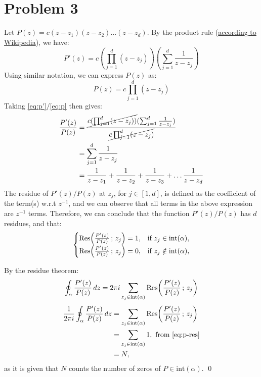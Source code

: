 \documentclass[letterpaper, titlepage, DIV=14]{scrartcl}
\begin{document}
    \section*{Problem 3}
    Let $P(z)=c(z-z_{1})(z-z_{2})\ldots(z-z_{d})$. By the product rule (\href{https://en.wikipedia.org/wiki/Product_rule}{according to Wikipedia}), we have:
    \begin{equation}
      P'(z) = c (\prod_{j=1}^{d}(z-z_{j}))(\sum_{j=1}^{d}\frac{1}{z-z_{j}}) \label{eq:p'}
    \end{equation}
    Using similar notation, we can express $P(z)$ as:
    \begin{equation}
      P(z) = c\prod_{j=1}^{d}(z-z_{j}) \label{eq:p}
    \end{equation}
    Taking \eqref{eq:p'}$/$\eqref{eq:p} then gives:
    \begin{align*}
      \frac{P'(z)}{P(z)} &= \frac{\cancel{c (\prod_{j=1}^{d}(z-z_{j}))}(\sum_{j=1}^{d}\frac{1}{z-z_{j}})}{\cancel{c\prod_{j=1}^{d}(z-z_{j})}} \\
        &= \sum_{j=1}^{d}\frac{1}{z-z_{j}} \\
        &= \frac{1}{z-z_{1}} + \frac{1}{z-z_{2}} + \frac{1}{z-z_{3}} + \ldots \frac{1}{z-z_{d}}
    \end{align*}
    The residue of $P'(z)/P(z)$ at $z_{j}$, for $j\in[1,d]$, is defined as the coefficient of the term(s) w.r.t $z^{-1}$, and we can observe that all terms in the above expression are $z^{-1}$ terms. Therefore, we can conclude that the function $P'(z)/P(z)$ has $d$ residues, and that:
    \begin{equation}
      \begin{cases}
        \Res(\frac{P'(z)}{P(z)} \, ; \, z_{j}) = 1, & \text{if } z_{j}\in\text{int}(\alpha), \\
        \Res(\frac{P'(z)}{P(z)} \, ; \, z_{j}) = 0, & \text{if } z_{j}\notin \text{int}(\alpha),
      \end{cases} \label{eq:p-res}
    \end{equation}
  
    By the residue theorem:
    \begin{equation*}
      \oint_{\alpha}\frac{P'(z)}{P(z)} \, dz = 2\pi i \sum_{z_{j}\in\text{int}(\alpha)} \Res(\frac{P'(z)}{P(z)} \, ; \, z_{j})
    \end{equation*}
    \begin{align*}
      \frac{1}{2\pi i}\oint_{\alpha}\frac{P'(z)}{P(z)} \, dz &= \sum_{z_{j}\in\text{int}(\alpha)} \Res(\frac{P'(z)}{P(z)} \, ; \, z_{j}) \\
      &= \sum_{z_{j}\in\text{int}(\alpha)} 1, \text{ from \eqref{eq:p-res}} \\
      &= N,
    \end{align*} as it is given that $N$ counts the number of zeros of $P\in\text{int}(\alpha)$. \qed
    
\end{document}
